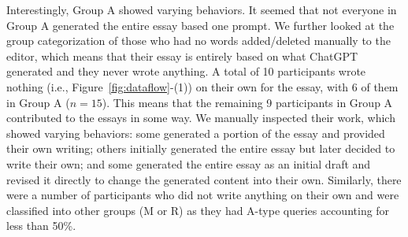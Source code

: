 \documentclass[manuscript,screen,acmsmall]{acmart}
\begin{document}
Interestingly, Group A showed varying behaviors. It seemed that not everyone in Group A generated the entire essay based one prompt. We further looked at the group categorization of those who had no words added/deleted manually to the editor, which means that their essay is entirely based on what ChatGPT generated and they never wrote anything. A total of 10 participants wrote nothing (i.e., Figure~\ref{fig:dataflow}-(1)) on their own for the essay, with 6 of them in Group A ($n=15$). This means that the remaining 9 participants in Group A contributed to the essays in some way. We manually inspected their work, which showed varying behaviors: some generated a portion of the essay and provided their own writing; others initially generated the entire essay but later decided to write their own; and some generated the entire essay as an initial draft and revised it directly to change the generated content into their own. Similarly, there were a number of participants who did not write anything on their own and were classified into other groups (M or R) as they had A-type queries accounting for less than 50\%. 



\end{document}
